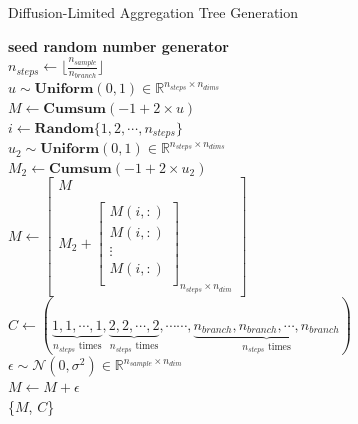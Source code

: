\begin{algorithm}
\caption{Diffusion-Limited Aggregation Tree Generation}
\label{alg:DLA}
    \textbf{seed random number generator}\\
    $n_{steps} \gets \lfloor\frac{n_{sample}}{n_{branch}}\rfloor$\\
    $u \sim \textbf{Uniform}(0,1)\in\mathbb{R}^{n_{steps} \times n_{dims}}$\\
    $M \gets \textbf{Cumsum}(-1 + 2 \times u)$\\
    {
         $i \gets \textbf{Random}\{1,2,\cdots, n_{steps}\}$\\
         $u_2 \sim \textbf{Uniform}(0,1)\in\mathbb{R}^{n_{steps} \times n_{dims}}$\\
         $M_2 \gets \textbf{Cumsum}(-1 + 2 \times u_2)$\\
        $M \gets \begin{bmatrix}M \\\\
            M_2 +\left[\begin{array}{c}
                M(i, :)\\
                M(i, :)\\
                \vdots\\
                M(i, :)\\
        \end{array}\right]_{n_{steps}\times n_{dim}} \end{bmatrix}$\\
    }
    $C \gets (\underbrace{1,1,\cdots, 1}_{n_{steps} \text{ times}}, \underbrace{2,2,\cdots, 2}_{n_{steps} \text{ times}},  \cdots\cdots, \underbrace{n_{branch},n_{branch},\cdots, n_{branch}}_{n_{steps} \text{ times}})$\\
    $\epsilon \sim \mathcal{N}(0, \sigma^2)\in\mathbb{R}^{n_{sample}\times n_{dim}}$\\
    $M \gets M + \epsilon$\\
    \Return \{$M$, $C$\}\\
\end{algorithm}


